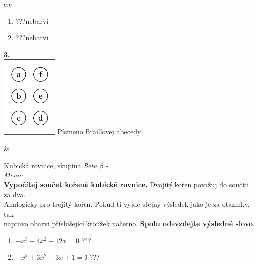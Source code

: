 \documentclass[10pt]{report}
\begin{document}
\begin{tabular}{c:c}
\begin{minipage}[c][99mm][t]{0.49\linewidth}
\begin{center}
\begin{minipage}{0.77\linewidth}
\begin{center}
\begin{varwidth}{\textwidth}
\begin{enumerate}
\item \quad \dotfill\; ???\;\dotfill \quad nebarvi
\item \quad \dotfill\; ???\;\dotfill \quad nebarvi
\end{enumerate}
\end{varwidth}
\end{center}
\end{minipage}
\begin{minipage}{0.20\linewidth}
\begin{center}
{\Huge\bfseries 3.} \\[2mm]
\includegraphics[height=40mm]{../images/braille.png}
{\small Písmeno Braillovej abecedy}
\end{center}
\end{minipage}
\end{center}
\end{minipage}
&
\begin{minipage}[c][99mm][t]{0.49\linewidth}
\begin{center}
\vspace{7mm}
{\huge Kubická rovnice, skupina \textit{Beta $\beta$} -}\\[4.5mm]
\textit{Meno:}\phantom{xxxxxxxxxxxxxxxxxxxxxxxxxxxxxxxxxxxxxxxxxxxxxxxxxxxxxxxxxxxxxxxxx}\\[3.5mm]
\textbf{Vypočítej součet kořenů kubické rovnice.} Dvojitý kořen považuj do součtu za dva.\\Analogicky pro trojitý kořen. Pokud ti vyjde stejný výsledek jako je za otazníky, tak\\napravo obarvi příslušející kroužek načerno. \textbf{Spolu odevzdejte výsledné slovo}.\\[3mm]
\begin{minipage}{0.77\linewidth}
\begin{center}
\begin{varwidth}{\textwidth}
\begin{enumerate}
\large
\item $-x^3-4x^2+12x=0$\quad \dotfill\; ???\;\dotfill {}
\item $-x^3+3x^2-3x+1=0$\quad \dotfill\; ???\;\dotfill {}

\end{enumerate}
\end{varwidth}
\end{center}
\end{minipage}
\end{center}
\end{minipage}
\end{tabular}
\end{document}
